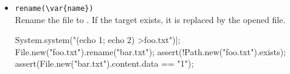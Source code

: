 \begin{itemize}
\item \lstinline|rename(\var{name})|\\
  Rename the file to .  If the target exists, it is replaced by
  the opened file.
\begin{urbiscript}[firstnumber=last]
System.system("(echo 1; echo 2) >foo.txt")|;
File.new("foo.txt").rename("bar.txt");
assert(!Path.new("foo.txt").exists);
assert(File.new("bar.txt").content.data == "1\n");
\end{urbiscript}


\end{itemize}


